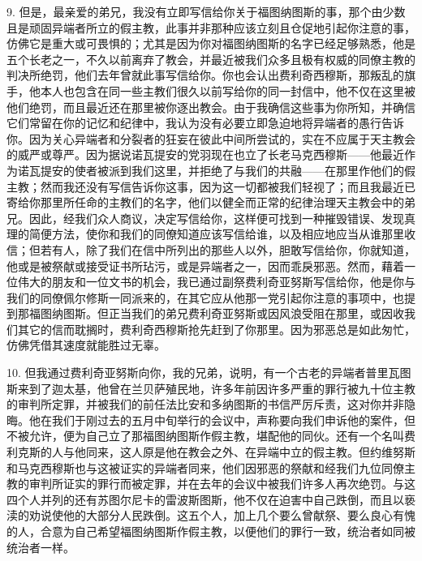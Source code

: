 9. 但是，最亲爱的弟兄，我没有立即写信给你关于福图纳图斯的事，那个由少数且是顽固异端者所立的假主教，此事并非那种应该立刻且仓促地引起你注意的事，仿佛它是重大或可畏惧的；尤其是因为你对福图纳图斯的名字已经足够熟悉，他是五个长老之一，不久以前离弃了教会，并最近被我们众多且极有权威的同僚主教的判决所绝罚，他们去年曾就此事写信给你。你也会认出费利奇西穆斯，那叛乱的旗手，他本人也包含在同一些主教们很久以前写给你的同一封信中，他不仅在这里被他们绝罚，而且最近还在那里被你逐出教会。由于我确信这些事为你所知，并确信它们常留在你的记忆和纪律中，我认为没有必要立即急迫地将异端者的愚行告诉你。因为关心异端者和分裂者的狂妄在彼此中间所尝试的，实在不应属于天主教会的威严或尊严。因为据说诺瓦提安的党羽现在也立了长老马克西穆斯——他最近作为诺瓦提安的使者被派到我们这里，并拒绝了与我们的共融——在那里作他们的假主教；然而我还没有写信告诉你这事，因为这一切都被我们轻视了；而且我最近已寄给你那里所任命的主教们的名字，他们以健全而正常的纪律治理天主教会中的弟兄。因此，经我们众人商议，决定写信给你，这样便可找到一种摧毁错误、发现真理的简便方法，使你和我们的同僚知道应该写信给谁，以及相应地应当从谁那里收信；但若有人，除了我们在信中所列出的那些人以外，胆敢写信给你，你就知道，他或是被祭献或接受证书所玷污，或是异端者之一，因而乖戾邪恶。然而，藉着一位伟大的朋友和一位文书的机会，我已通过副祭费利奇亚努斯写信给你，他是你与我们的同僚佩尔修斯一同派来的，在其它应从他那一党引起你注意的事项中，也提到那福图纳图斯。但正当我们的弟兄费利奇亚努斯或因风浪受阻在那里，或因收我们其它的信而耽搁时，费利奇西穆斯抢先赶到了你那里。因为邪恶总是如此匆忙，仿佛凭借其速度就能胜过无辜。\par

10. 但我通过费利奇亚努斯向你，我的兄弟，说明，有一个古老的异端者普里瓦图斯来到了迦太基，他曾在兰贝萨殖民地，许多年前因许多严重的罪行被九十位主教的审判所定罪，并被我们的前任法比安和多纳图斯的书信严厉斥责，这对你并非隐晦。他在我们于刚过去的五月中旬举行的会议中，声称要向我们申诉他的案件，但不被允许，便为自己立了那福图纳图斯作假主教，堪配他的同伙。还有一个名叫费利克斯的人与他同来，这人原是他在教会之外、在异端中立的假主教。但约维努斯和马克西穆斯也与这被证实的异端者同来，他们因邪恶的祭献和经我们九位同僚主教的审判所证实的罪行而被定罪，并在去年的会议中被我们许多人再次绝罚。与这四个人并列的还有苏图尔尼卡的雷波斯图斯，他不仅在迫害中自己跌倒，而且以亵渎的劝说使他的大部分人民跌倒。这五个人，加上几个要么曾献祭、要么良心有愧的人，合意为自己希望福图纳图斯作假主教，以便他们的罪行一致，统治者如同被统治者一样。\par

